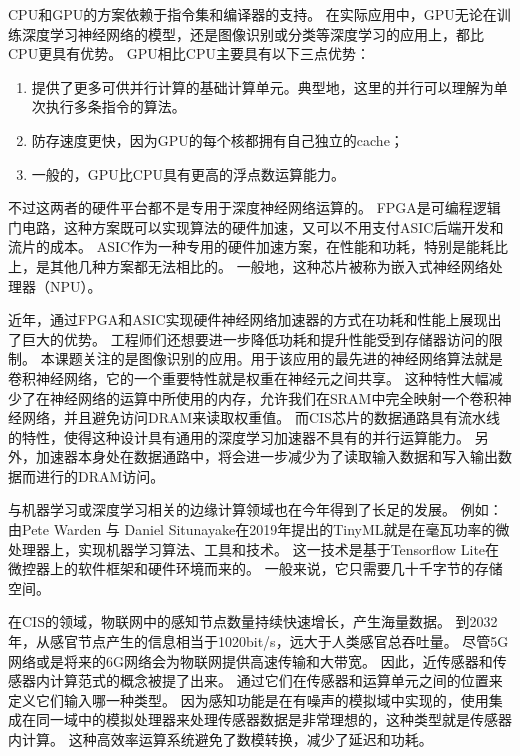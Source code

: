 CPU和GPU的方案依赖于指令集和编译器的支持。
在实际应用中，GPU无论在训练深度学习神经网络的模型，还是图像识别或分类等深度学习的应用上，都比CPU更具有优势。
GPU相比CPU主要具有以下三点优势：
\begin{enumerate}
    \item 提供了更多可供并行计算的基础计算单元。典型地，这里的并行可以理解为单次执行多条指令的算法。
    \item 防存速度更快，因为GPU的每个核都拥有自己独立的cache；
    \item 一般的，GPU比CPU具有更高的浮点数运算能力。
\end{enumerate}
不过这两者的硬件平台都不是专用于深度神经网络运算的。
FPGA是可编程逻辑门电路，这种方案既可以实现算法的硬件加速，又可以不用支付ASIC后端开发和流片的成本。
ASIC作为一种专用的硬件加速方案，在性能和功耗，特别是能耗比上，是其他几种方案都无法相比的。
一般地，这种芯片被称为嵌入式神经网络处理器（NPU）。

近年，通过FPGA和ASIC实现硬件神经网络加速器的方式在功耗和性能上展现出了巨大的优势。
工程师们还想要进一步降低功耗和提升性能受到存储器访问的限制。
本课题关注的是图像识别的应用。用于该应用的最先进的神经网络算法就是卷积神经网络，它的一个重要特性就是权重在神经元之间共享。
这种特性大幅减少了在神经网络的运算中所使用的内存，允许我们在SRAM中完全映射一个卷积神经网络，并且避免访问DRAM来读取权重值。
而CIS芯片的数据通路具有流水线的特性，使得这种设计具有通用的深度学习加速器不具有的并行运算能力。
另外，加速器本身处在数据通路中，将会进一步减少为了读取输入数据和写入输出数据而进行的DRAM访问。   

与机器学习或深度学习相关的边缘计算领域也在今年得到了长足的发展。
例如：由Pete Warden 与 Daniel Situnayake在2019年提出的TinyML就是在毫瓦功率的微处理器上，实现机器学习算法、工具和技术。%
这一技术是基于Tensorflow Lite在微控器上的软件框架和硬件环境而来的。
一般来说，它只需要几十千字节的存储空间。  

在CIS的领域，物联网中的感知节点数量持续快速增长，产生海量数据。
到2032年，从感官节点产生的信息相当于1020bit/s，远大于人类感官总吞吐量。%
尽管5G网络或是将来的6G网络会为物联网提供高速传输和大带宽。
因此，近传感器和传感器内计算范式的概念被提了出来。
通过它们在传感器和运算单元之间的位置来定义它们输入哪一种类型。
因为感知功能是在有噪声的模拟域中实现的，使用集成在同一域中的模拟处理器来处理传感器数据是非常理想的，这种类型就是传感器内计算。
这种高效率运算系统避免了数模转换，减少了延迟和功耗。




